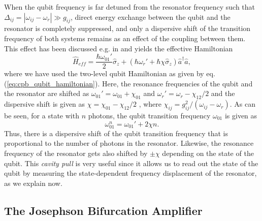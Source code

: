 When the qubit frequency is far detuned from the resonator frequency such that $\Delta_{ij}=|\omega_{ij}-\omega_r| \gg g_{ij}$, direct energy exchange between the qubit and the resonator is completely suppressed, and only a dispersive shift of the transition frequency of both systems remains as an effect of the coupling between them. This effect has been discussed e.g. in \cite{blais_cavity_2004,koch_charge-insensitive_2007} and yields the effective Hamiltonian
%
\begin{equation}
\hat{H}_{eff} = \frac{\hbar\omega_{01}'}{2}\hat{\sigma}_z+(\hbar\omega_r'+\hbar \chi \hat{\sigma}_z)\hat{a}^\dagger \hat{a}, \label{eq:dispersive_interaction}
\end{equation}
%
where we have used the two-level qubit Hamiltonian as given by eq. (\ref{eq:cpb_qubit_hamiltonian}). Here, the resonance frequencies of the qubit and the resonator are shifted as $\omega_{01}'=\omega_{01}+\chi_{01}$ and $\omega_r' = \omega_{r}-\chi_{12}/2$ and the dispersive shift is given as $\chi=\chi_{01}-\chi_{12}/2$ \citep{koch_charge-insensitive_2007}, where $\chi_{ij}=g_{ij}^2/(\omega_{ij}-\omega_r)$. As can be seen, for a state with $n$ photons, the qubit transition frequency $\omega_{01}$ is given as
%
\begin{equation}
\omega_{01}^n = \omega_{01}'+2\chi n. \label{eq:stark_shift}
\end{equation}
%
Thus, there is a dispersive shift of the qubit transition frequency that is proportional to the number of photons in the resonator. Likewise, the resonance frequency of the resonator gets also shifted by $\pm\chi$ depending on the state of the qubit. This {\it cavity pull} is very useful since it allows us to read out the state of the qubit by measuring the state-dependent frequency displacement of the resonator, as we explain now.

\subsection{The Josephson Bifurcation Amplifier} \label{section:cjba}

